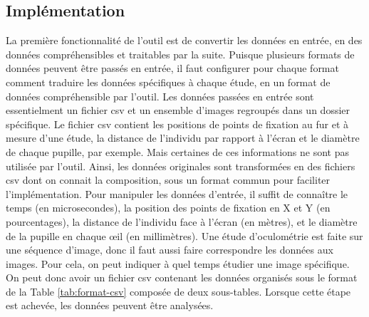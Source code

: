 \documentclass[hidelinks,12pt]{article}
\begin{document}
\subsection{Implémentation}

La première fonctionnalité de l'outil est de convertir les données en entrée,
en des données compréhensibles et traitables par la suite. Puisque plusieurs
formats de données peuvent être passés en entrée, il faut configurer pour
chaque format comment traduire les données spécifiques à chaque étude, en un
format de données compréhensible par l'outil. Les données passées en entrée
sont essentielment un fichier csv et un ensemble d'images regroupés dans un
dossier spécifique. Le fichier csv contient les positions de points de fixation
au fur et à mesure d'une étude, la distance de l'individu par rapport à l'écran
et le diamètre de chaque pupille, par exemple. Mais certaines de ces
informations ne sont pas utilisée par l'outil. Ainsi, les données originales
sont transformées en des fichiers csv dont on connait la composition,
sous un format commun pour faciliter l'implémentation. Pour manipuler les
données d'entrée, il suffit de connaître le temps (en microsecondes), la
position des points de fixation en X et Y (en pourcentages), la distance de
l'individu face à l'écran (en mètres), et le diamètre de la pupille en chaque
œil (en millimètres). Une étude d'oculométrie est faite sur une séquence
d'image, donc il faut aussi faire correspondre les données aux images. Pour
cela, on peut indiquer à quel temps étudier une image spécifique. On peut donc
avoir un fichier csv contenant les données organisés sous le format de la Table
\ref{tab:format-csv} composée de deux sous-tables. Lorsque cette étape est
achevée, les données peuvent être analysées.
\end{document}

